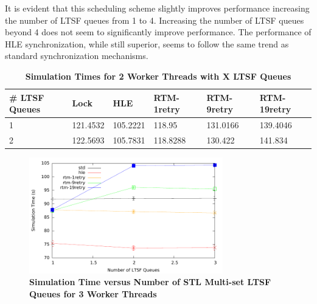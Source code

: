 \documentclass[11pt]{book}
\begin{document}
It is evident that this scheduling scheme slightly improves performance increasing the
number of LTSF queues from 1 to 4.  Increasing the number of LTSF queues beyond 4 does not
seem to significantly improve performance.  The performance of HLE synchronization, while
still superior, seems to follow the same trend as standard synchronization mechanisms.


\begin{table}
    \centering
    \begin{tabular}{l|p{2cm}|p{2cm}|p{2cm}|p{2cm}|p{2cm}}
        \textbf{\# LTSF Queues}&Lock &HLE &RTM-1retry &RTM-9retry &RTM-19retry \\
        \hline
        \midrule
            1 &121.4532  &105.2221 &118.95   &131.0166 &139.4046 \\ 
            2 &122.5693  &105.7831 &118.8288 &130.422  &141.834  \\
    \end{tabular}
    \caption{\textbf{Simulation Times for 2 Worker Threads with X LTSF
        Queues}}\label{tab:contThrMig_2threadsXschq}
\end{table}

\begin{figure}
    \centering
    \graphicspath{ {./figures/} }
    \includegraphics[width=0.75\textwidth,keepaspectratio]{hugeepidemicsim-CONTmig-timeVSschedQs-multiset-3thread}
    \caption{\textbf{Simulation Time versus Number of STL Multi-set LTSF Queues for 3
        Worker Threads}}\label{fig:contThrMig_timeVSschq_3threads}
\end{figure}
\end{document}
